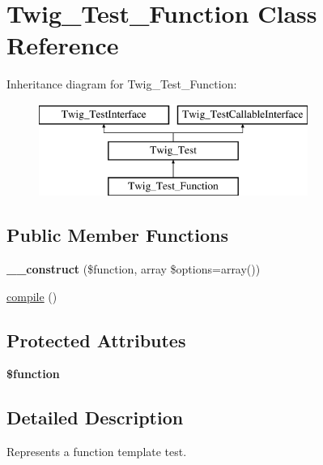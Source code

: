 \hypertarget{classTwig__Test__Function}{}\section{Twig\+\_\+\+Test\+\_\+\+Function Class Reference}
\label{classTwig__Test__Function}
Inheritance diagram for Twig\+\_\+\+Test\+\_\+\+Function\+:\begin{figure}[H]
\begin{center}
\leavevmode
\includegraphics[height=3.000000cm]{classTwig__Test__Function}
\end{center}
\end{figure}
\subsection*{Public Member Functions}
\begin{DoxyCompactItemize}
\item 
{\bfseries \+\_\+\+\_\+construct} (\$function, array \$options=array())\hypertarget{classTwig__Test__Function_a8324cde29bf49c7431cae3daaf789c1b}{}\label{classTwig__Test__Function_a8324cde29bf49c7431cae3daaf789c1b}

\item 
\hyperlink{classTwig__Test__Function_aca5d9d14f4fb4d76cd9f5f9139d423b3}{compile} ()
\end{DoxyCompactItemize}
\subsection*{Protected Attributes}
\begin{DoxyCompactItemize}
\item 
{\bfseries \$function}\hypertarget{classTwig__Test__Function_a8a67b2666170ecf6810d0ada61fd3ed7}{}\label{classTwig__Test__Function_a8a67b2666170ecf6810d0ada61fd3ed7}

\end{DoxyCompactItemize}


\subsection{Detailed Description}
Represents a function template test.


